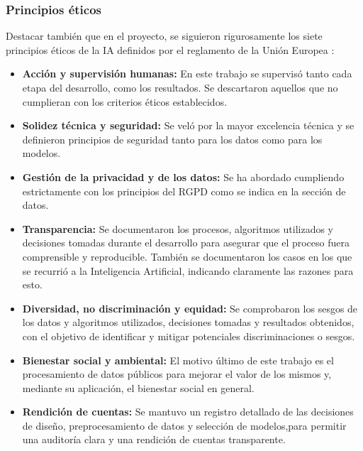 \subsubsection{Principios éticos}  \label{sec:Metodos_Principios_EU}

Destacar también que en el proyecto, se siguieron rigurosamente los siete principios éticos de la IA definidos por el reglamento de la Unión Europea \citep{webRIA2024Europa}:

\begin{itemize} 
	\item \textbf{Acción y supervisión humanas:} En este trabajo se supervisó tanto cada etapa del desarrollo, como los resultados. Se descartaron aquellos que no cumplieran con los criterios éticos establecidos.
	
	\item \textbf{Solidez técnica y seguridad:} Se veló por la mayor excelencia técnica y se definieron principios de seguridad tanto para los datos como para los modelos.
	
	\item \textbf{Gestión de la privacidad y de los datos:} Se ha abordado cumpliendo estrictamente con los principios del RGPD como se indica en la sección de datos.
	
	\item \textbf{Transparencia:} Se documentaron los procesos, algoritmos utilizados y decisiones tomadas durante el desarrollo para asegurar que el proceso fuera comprensible y reproducible. También se documentaron los casos en los que se recurrió a la Inteligencia Artificial, indicando claramente las razones para esto.
	
	\item \textbf{Diversidad, no discriminación y equidad:} Se comprobaron los sesgos de los datos y algoritmos utilizados, decisiones tomadas y resultados obtenidos, con el objetivo de identificar y mitigar potenciales discriminaciones o sesgos.
	
	\item \textbf{Bienestar social y ambiental:} El motivo último de este trabajo es el procesamiento de datos públicos para mejorar el valor de los mismos y, mediante su aplicación, el bienestar social en general.
	
	\item \textbf{Rendición de cuentas:} Se mantuvo un registro detallado de las decisiones de diseño, preprocesamiento de datos y selección de modelos,para permitir una auditoría clara y una rendición de cuentas transparente.
\end{itemize}




